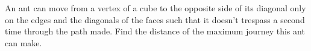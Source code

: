 An ant can move from a vertex of a cube to the opposite side of its diagonal only on the edges and the diagonals of the faces such that it doesn’t trespass a second time through the path made. Find the distance of the maximum journey this ant can make.